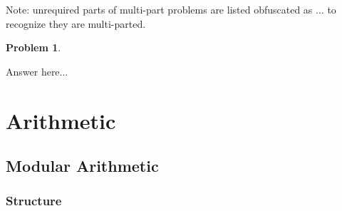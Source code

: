 \documentclass[12pt]{article}
\newtheorem{problem}{Problem}
\numberwithin{problem}{section} %
\theoremstyle{remark}  %
\newenvironment{answer}
    {\begin{adjustwidth}{0pt}{0pt}}
    {\end{adjustwidth}}
\begin{document}
 
%
\rhead{\today}
Note: unrequired parts of multi-part problems are listed obfuscated as $\dots$ to recognize they are multi-parted.

\begin{problem}
        
\end{problem}
\begin{answer}
    Answer here...
\end{answer}

\section{Arithmetic}
\setcounter{subsection}{1}
\subsection{Modular Arithmetic}
\setcounter{subsubsection}{3}

\subsubsection{Structure}
\end{document}
